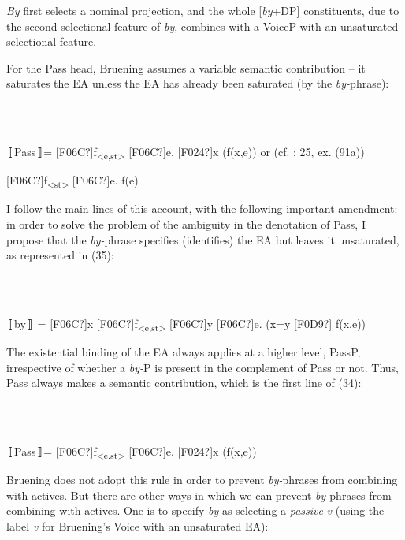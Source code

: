 \documentclass[output=paper]{langsci/langscibook}
\begin{document}
\textit{By} first selects a nominal projection, and the whole [\textit{by}+DP] constituents, due to the second selectional feature of \textit{by}, combines with a VoiceP with an unsaturated selectional feature. 

For the Pass head, Bruening assumes a variable semantic contribution – it saturates the EA unless the EA has already been saturated (by the \textit{by-}phrase):

\ea%
    \label{ex:key:34}
    \gll\\
        \\
    \glt
    \z

          〚Pass〛= [F06C?]f\textsubscript{<e,st>} [F06C?]e. [F024?]x (f(x,e))  or    (cf. \citealt{Bruening2012}: 25, ex. (91a))

     [F06C?]f\textsubscript{<st>} [F06C?]e. f(e) 

I follow the main lines of this account, with the following important amendment: in order to solve the problem of the ambiguity in the denotation of Pass, I propose that the \textit{by-}phrase specifies (identifies) the EA but leaves it unsaturated, as represented in (35):

\ea%
    \label{ex:key:35}
    \gll\\
        \\
    \glt
    \z

          〚by〛 = [F06C?]x [F06C?]f\textsubscript{<e,st>} [F06C?]y [F06C?]e. (x=y [F0D9?] f(x,e))

The existential binding of the EA always applies at a higher level, PassP, irrespective of whether a \textit{by-}P is present in the complement of Pass or not. Thus, Pass always makes a semantic contribution, which is the first line of (34):

\ea%
    \label{ex:key:36}
    \gll\\
        \\
    \glt
    \z

          〚Pass〛= [F06C?]f\textsubscript{<e,st>} [F06C?]e. [F024?]x (f(x,e))

Bruening does not adopt this rule in order to prevent \textit{by-}phrases from combining with actives. But there are other ways in which we can prevent \textit{by-}phrases from combining with actives. One is to specify \textit{by} as selecting a \textit{passive} \textit{v} (using the label \textit{v} for Bruening’s Voice with an unsaturated EA):

\ea%
    \label{ex:key:37}
    \gll\\
        \\
    \glt
    \z
\end{document}
